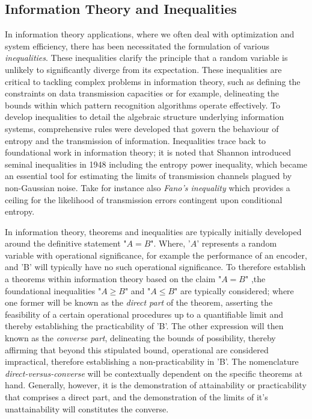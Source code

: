 \documentclass[12pt]{article}
\begin{document}
		
		\subsection{Information Theory and Inequalities}
		
		In information theory applications, where we often deal with optimization and system efficiency, there has been necessitated the formulation of various \emph{inequalities}. These inequalities clarify the principle that a random variable is unlikely to significantly diverge from its expectation.  These inequalities are critical to tackling complex problems in information theory, such as defining the constraints on data transmission capacities or for example, delineating the bounds within which pattern recognition algorithms operate effectively. To develop inequalities to detail the algebraic structure underlying information systems,  comprehensive rules were  developed that govern the behaviour of entropy and the transmission of information.  Inequalities trace back to foundational work in information theory; it is noted that Shannon introduced seminal inequalities in 1948  including the entropy power inequality, which became an essential tool for estimating the limits of transmission channels plagued by non-Gaussian noise. Take for instance also \emph{Fano's inequality} which provides a ceiling for the likelihood of transmission errors contingent upon conditional entropy.
		
		In information theory, theorems and inequalities are typically initially developed around the definitive statement "$A = B$". Where, '$A$' represents a random variable  with operational significance, for example the performance of an encoder, and 'B' will typically have no such operational significance. To therefore establish a theorems within information theory based on the claim "$A=B$" ,the foundational inequalities "$A \geq B$" and "$A \leq B$" are typically considered; where one former will be known as the \emph{direct part} of the theorem, asserting the feasibility of a certain operational procedures up to a quantifiable limit and thereby establishing the practicability of 'B'. The other expression will then known as the \emph{converse part}, delineating the bounds of possibility, thereby affirming that beyond this stipulated bound,  operational are considered impractical, therefore establishing a non-practicability in 'B'. The nomenclature \emph{direct-versus-converse} will be contextually dependent on the specific theorems at hand. Generally, however, it is the demonstration of attainability or practicability that comprises a direct part, and the demonstration of the limits of it's unattainability will constitutes the converse.
		
\end{document}
